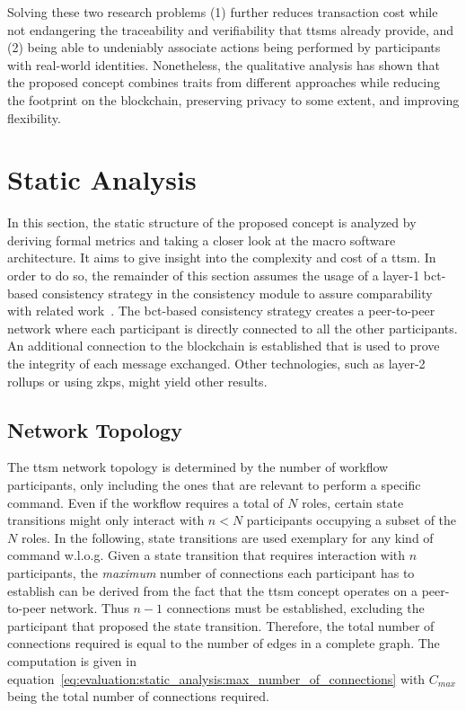 Solving these two research problems (1) further reduces transaction cost while not endangering the traceability and verifiability that \glspl{ttsm} already provide, and (2) being able to undeniably associate actions being performed by participants with real-world identities. Nonetheless, the qualitative analysis has shown that the proposed concept combines traits from different approaches while reducing the footprint on the blockchain, preserving privacy to some extent, and improving flexibility.



\section{Static Analysis}
\label{sec:evaluation:static_analysis}
In this section, the static structure of the proposed concept is analyzed by deriving formal metrics and taking a closer look at the macro software architecture. It aims to give insight into the complexity and cost of a \gls{ttsm}. In order to do so, the remainder of this section assumes the usage of a layer-1 \gls{bct}-based consistency strategy in the consistency module to assure comparability with related work~\cite{untrusted_bp_execution_using_blockchain,interpreted_bp_on_blockchain_loukil,runtime_verification_for_bp_utilizing_bitcoin,interpreted_bp_on_blockchain_weber}. The \gls{bct}-based consistency strategy creates a peer-to-peer network where each participant is directly connected to all the other participants. An additional connection to the blockchain is established that is used to prove the integrity of each message exchanged. Other technologies, such as layer-2 rollups or using \glspl{zkp}, might yield other results.


\subsection{Network Topology}
\label{sec:evaluation:static_analysis:network_topology}
The \gls{ttsm} network topology is determined by the number of workflow participants, only including the ones that are relevant to perform a specific command. Even if the workflow requires a total of $N$ roles, certain state transitions might only interact with $n < N$ participants occupying a subset of the $N$ roles. In the following, state transitions are used exemplary for any kind of command w.l.o.g. Given a state transition that requires interaction with $n$ participants, the \textit{maximum} number of connections each participant has to establish can be derived from the fact that the \gls{ttsm} concept operates on a peer-to-peer network. Thus $n - 1$ connections must be established, excluding the participant that proposed the state transition. Therefore, the total number of connections required is equal to the number of edges in a complete graph. The computation is given in equation~\ref{eq:evaluation:static_analysis:max_number_of_connections} with $C_{max}$ being the total number of connections required. %

